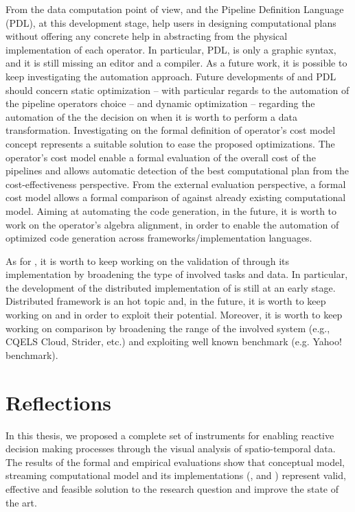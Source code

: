 From the data computation point of view, \river{} and the Pipeline Definition Language (PDL), at this development stage, help users in designing computational plans without offering any concrete help in abstracting from the physical implementation of each operator.
In particular, PDL, is only a graphic syntax, and it is still missing an editor and a compiler.
As a future work, it is possible to keep investigating the automation approach.
Future developments of \river{} and PDL should concern static optimization -- with particular regards to the automation of the pipeline operators choice -- and dynamic optimization -- regarding the automation of the the decision on when it is worth to perform a data transformation.
Investigating on the formal definition of operator's cost model concept represents a suitable solution to ease the proposed optimizations.
The operator's cost model enable a formal evaluation of the overall cost of the pipelines and allows automatic  detection of the best computational plan from the cost-effectiveness perspective. 
From the external evaluation perspective, a formal cost model allows a formal comparison of \river{} against already existing computational model.
Aiming at automating the code generation, in the future, it is worth to work on the operator's algebra alignment, in order to enable the automation of optimized code generation across frameworks/implementation languages.

As for \frappe{}, it is worth to keep working on the validation of \river{} through its implementation by broadening the type of involved tasks and data.
In particular, the development of the distributed implementation of \river{} is still at an early stage. 
Distributed framework is an hot topic and, in the future, it is worth to keep working on \sparkdi{} and \hivedi{} in order to exploit their potential.
Moreover, it is worth to keep working on comparison by broadening the range of the involved system (e.g., CQELS Cloud, Strider, etc.) and exploiting well known benchmark (e.g. Yahoo! benchmark).

\section{Reflections}

In this thesis, we proposed a complete set of instruments for enabling reactive decision making processes through the visual analysis of spatio-temporal data.
The results of the formal and empirical evaluations show that \frappe{} conceptual model, \river{} streaming computational model and its implementations (\sti{}, \sparkdi{} and \hivedi{}) represent valid, effective and feasible solution to the research question and improve the state of the art.

